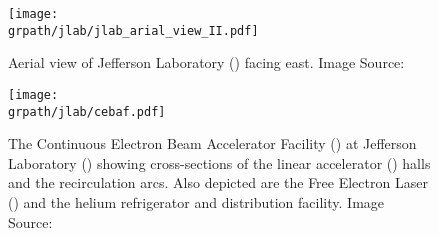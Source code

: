 \begin{figure}[H]
\centering
\texttt{[image: \\grpath/jlab/jlab\_arial\_view\_II.pdf]}
\caption[Aerial view of Jefferson Laboratory () facing east]{\label{fig:jlab.aerial}Aerial view of Jefferson Laboratory () facing east. Image Source: \cite{cebafflckr}}
\end{figure}
%
\begin{figure}\begin{center}
\texttt{[image: \\grpath/jlab/cebaf.pdf]}
\caption[The Continuous Electron Beam Accelerator Facility () at Jefferson Laboratory ()]{\label{fig:jlab.cebaf}The Continuous Electron Beam Accelerator Facility () at Jefferson Laboratory () showing cross-sections of the linear accelerator () halls and the recirculation arcs. Also depicted are the Free Electron Laser (\label{abbr:fel}) and the helium refrigerator and distribution facility. Image Source:\cite{cebaf}}
\end{center}\end{figure}
\FloatBarrier

%




